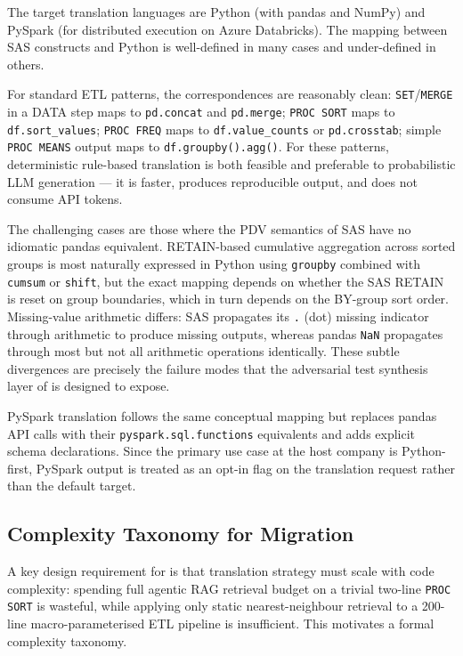 The target translation languages are Python (with pandas and NumPy) and
PySpark (for distributed execution on Azure Databricks). The mapping between
SAS constructs and Python is well-defined in many cases and under-defined in
others.

For standard ETL patterns, the correspondences are reasonably clean:
\texttt{SET}/\texttt{MERGE} in a DATA step maps to \texttt{pd.concat} and
\texttt{pd.merge}; \texttt{PROC SORT} maps to \texttt{df.sort\_values};
\texttt{PROC FREQ} maps to \texttt{df.value\_counts} or
\texttt{pd.crosstab}; simple \texttt{PROC MEANS} output maps to
\texttt{df.groupby().agg()}. For these patterns, deterministic rule-based
translation is both feasible and preferable to probabilistic \ac{LLM}
generation --- it is faster, produces reproducible output, and does not
consume API tokens.

The challenging cases are those where the PDV semantics of SAS have no
idiomatic pandas equivalent. RETAIN-based cumulative aggregation across sorted
groups is most naturally expressed in Python using \texttt{groupby} combined
with \texttt{cumsum} or \texttt{shift}, but the exact mapping depends on
whether the SAS RETAIN is reset on group boundaries, which in turn depends on
the BY-group sort order. Missing-value arithmetic differs: SAS propagates its
\texttt{.} (dot) missing indicator through arithmetic to produce missing
outputs, whereas pandas \texttt{NaN} propagates through most but not all
arithmetic operations identically. These subtle divergences are precisely the
failure modes that the adversarial test synthesis layer of \codara{} is
designed to expose.

PySpark translation follows the same conceptual mapping but replaces pandas
\ac{API} calls with their \texttt{pyspark.sql.functions} equivalents and
adds explicit schema declarations. Since the primary use case at the host
company is Python-first, PySpark output is treated as an opt-in flag on the
translation request rather than the default target.

\subsection{Complexity Taxonomy for Migration}
\label{subsec:complexity-taxonomy}

A key design requirement for \codara{} is that translation strategy must scale
with code complexity: spending full agentic \ac{RAG} retrieval budget on a
trivial two-line \texttt{PROC SORT} is wasteful, while applying only static
nearest-neighbour retrieval to a 200-line macro-parameterised ETL pipeline is
insufficient. This motivates a formal complexity taxonomy.


